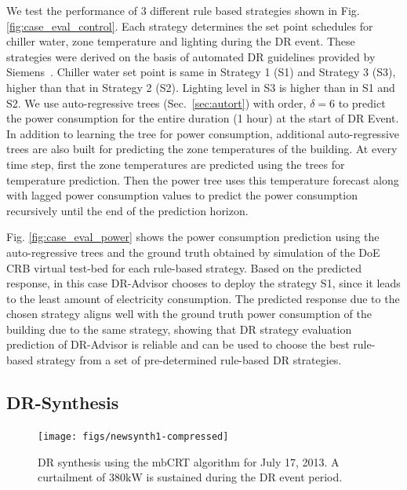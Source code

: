 We test the performance of 3 different rule based strategies shown in Fig. \ref{fig:case_eval_control}. 
Each strategy determines the set point schedules for chiller water, zone temperature and lighting during the DR event. 
These strategies were derived on the basis of automated DR guidelines provided by Siemens~\cite{siemensdr}.
Chiller water set point is same in Strategy 1 (S1) and Strategy 3 (S3), higher than that in Strategy 2 (S2). Lighting level in S3 is higher than in S1 and S2.
We use auto-regressive trees (Sec.~\ref{sec:autort}) with order, $\delta = 6$ to predict the power consumption for the entire duration (1 hour) at the start of DR Event. In addition to learning the tree for power consumption, additional auto-regressive trees are also built for predicting the zone temperatures of the building.
At every time step, first the zone temperatures are predicted using the trees for temperature prediction. 
Then the power tree uses this temperature forecast along with lagged power consumption values to predict the power consumption recursively until the end of the prediction horizon.

Fig. \ref{fig:case_eval_power} shows the power consumption prediction using the auto-regressive trees and the ground truth obtained by simulation of the DoE CRB virtual test-bed for each rule-based strategy. 
Based on the predicted response, in this case DR-Advisor chooses to deploy the strategy S1, since it leads to the least amount of electricity consumption. The predicted response due to the chosen strategy aligns well with the ground truth power consumption of the building due to the same strategy, showing that DR strategy evaluation prediction of DR-Advisor is reliable and can be used to choose the best rule-based strategy from a set of pre-determined rule-based DR strategies.

\subsection{DR-Synthesis}
\label{sec:case_syn}

 \begin{figure}
\centering
\texttt{[image: figs/newsynth1-compressed]}
\caption{DR synthesis using the mbCRT algorithm for July 17, 2013. A curtailment of $380\si{\kilo\watt}$ is sustained during the DR event period.}
\label{fig:synthesis}
\vspace{-10pt}
\end{figure}

